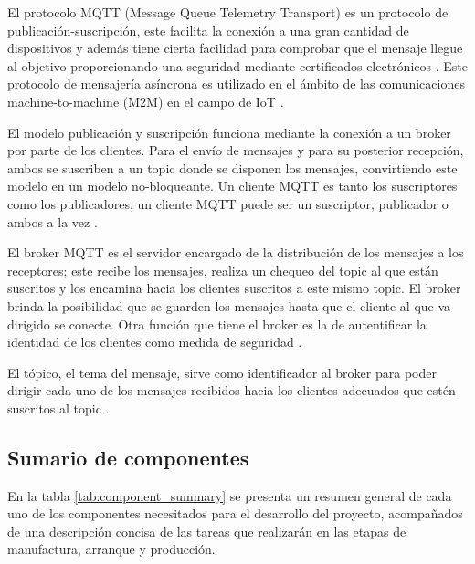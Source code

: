 \documentclass{article}
\begin{document}
                El protocolo MQTT (Message Queue Telemetry Transport) es un protocolo de publicación-suscripción, este facilita la conexión a una gran cantidad de dispositivos y además tiene cierta facilidad para comprobar que el mensaje llegue al objetivo proporcionando una seguridad mediante certificados electrónicos \cite{lliso2021uso}. Este protocolo de mensajería asíncrona es utilizado en el ámbito de las comunicaciones machine-to-machine (M2M) en el campo de IoT \cite{mahedero2020desarrollo}.

                El modelo publicación y suscripción funciona mediante la conexión a un broker por parte de los clientes. Para el envío de mensajes y para su posterior recepción, ambos se suscriben a un topic donde se disponen los mensajes, convirtiendo este modelo en un modelo no-bloqueante. Un cliente MQTT es tanto los suscriptores como los publicadores, un cliente MQTT puede ser un suscriptor, publicador o ambos a la vez \cite{mahedero2020desarrollo}.

                El broker MQTT es el servidor encargado de la distribución de los mensajes a los receptores; este recibe los mensajes, realiza un chequeo del topic al que están suscritos y los encamina hacia los clientes suscritos a este mismo topic. El broker brinda la posibilidad que se guarden los mensajes hasta que el cliente al que va dirigido se conecte. Otra función que tiene el broker es la de autentificar la identidad de los clientes como medida de seguridad \cite{mahedero2020desarrollo}.

                El tópico, el tema del mensaje, sirve como identificador al broker para poder dirigir cada uno de los mensajes recibidos hacia los clientes adecuados que estén suscritos al topic \cite{mahedero2020desarrollo}.

        \subsection{Sumario de componentes}

            En la tabla \ref{tab:component_summary} se presenta un resumen general de cada uno de los componentes necesitados para el desarrollo del proyecto, acompañados de una descripción concisa de las tareas que realizarán en las etapas de manufactura, arranque y producción.
\end{document}
